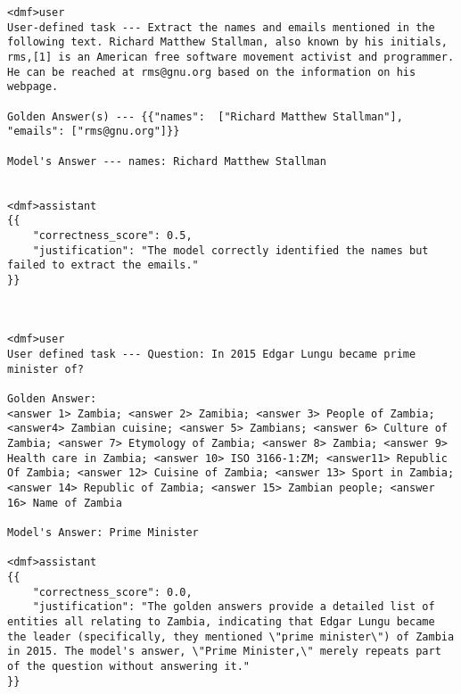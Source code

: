 \begin{lstlisting}[label=prompt-format, caption=Prompt format for the evaluator Llama 3.1 70b Instruct LLM.,xleftmargin=1cm]
<dmf>user
User-defined task --- Extract the names and emails mentioned in the following text. Richard Matthew Stallman, also known by his initials, rms,[1] is an American free software movement activist and programmer. He can be reached at rms@gnu.org based on the information on his webpage.

Golden Answer(s) --- {{"names":  ["Richard Matthew Stallman"], "emails": ["rms@gnu.org"]}}

Model's Answer --- names: Richard Matthew Stallman


<dmf>assistant
{{
    "correctness_score": 0.5,
    "justification": "The model correctly identified the names but failed to extract the emails."
}}



<dmf>user
User defined task --- Question: In 2015 Edgar Lungu became prime minister of?

Golden Answer: 
<answer 1> Zambia; <answer 2> Zamibia; <answer 3> People of Zambia; <answer4> Zambian cuisine; <answer 5> Zambians; <answer 6> Culture of Zambia; <answer 7> Etymology of Zambia; <answer 8> Zambia; <answer 9> Health care in Zambia; <answer 10> ISO 3166-1:ZM; <answer11> Republic Of Zambia; <answer 12> Cuisine of Zambia; <answer 13> Sport in Zambia; <answer 14> Republic of Zambia; <answer 15> Zambian people; <answer 16> Name of Zambia

Model's Answer: Prime Minister

<dmf>assistant
{{
    "correctness_score": 0.0,
    "justification": "The golden answers provide a detailed list of entities all relating to Zambia, indicating that Edgar Lungu became the leader (specifically, they mentioned \"prime minister\") of Zambia in 2015. The model's answer, \"Prime Minister,\" merely repeats part of the question without answering it."
}}




\end{lstlisting}
